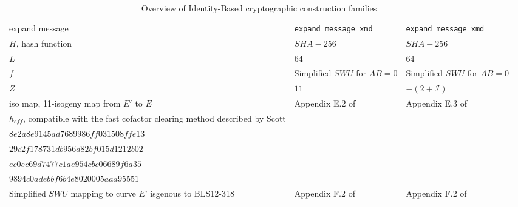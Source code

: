 \begin{table}[h]
\begin{tabular}{ |p{3cm}||p{6cm}|p{6cm}|  }
		expand message	& \lstinline|expand_message_xmd| & \lstinline|expand_message_xmd| \\
		$H$, hash function	& $SHA-256$ & $SHA-256$ \\
		$L$	& $64$ & $64$ \\		
		$f$ & Simplified $SWU$ for $AB=0$  & Simplified $SWU$ for $AB=0$ \\
		$Z$ & $11$  & $-(2 + \mathcal{I})$ \\
		iso map, 11-isogeny map from $E'$ to $E$	& Appendix E.2 of \cite{ecc.hashing}  & Appendix E.3 of \cite{ecc.hashing} \\
		$h_{eff}$, compatible with the fast cofactor clearing method described by Scott \cite{WB19} 	& \makecell[l]{
			\texttt{$0xd201000000010001$}} & \makecell[l]{
			\texttt{$0xbc69f08f2ee75b3584c6a0ea91b35288$} \\
			\texttt{$8e2a8e9145ad7689986ff031508ffe13$} \\
			\texttt{$29c2f178731db956d82bf015d1212b02$} \\
			\texttt{$ec0ec69d7477c1ae954cbc06689f6a35$} \\
			\texttt{$9894c0adebbf6b4e8020005aaa95551$}
		}\vspace{12pt} \\
		Simplified $SWU$ mapping to curve $E’$ isgenous to BLS12-318 	& Appendix F.2 of  \cite{ecc.hashing} &  Appendix F.2 of  \cite{ecc.hashing}\\
		\hline
	\end{tabular}
	\caption{ Overview of Identity-Based cryptographic construction families  \cite{theory.ec.ibeupdate}}
	\label{tab:bls12381hashg1g2}
\end{table}
